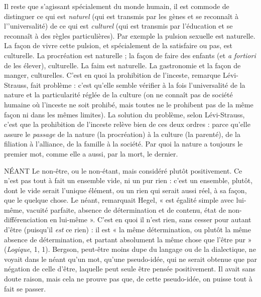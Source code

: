 Il reste que s’agissant spécialement du monde humain, il est commode de
distinguer ce qui est {\it naturel} (qui est transmis par les gènes et se reconnaît à
l’'universalité) de ce qui est {\it culturel} (qui est transmis par l'éducation et se reconnaît
à des règles particulières). Par exemple la pulsion sexuelle est naturelle. La
façon de vivre cette pulsion, et spécialement de la satisfaire ou pas, est culturelle.
La procréation est naturelle ; la façon de faire des enfants (et {\it a fortiori} de
les élever), culturelle. La faim est naturelle. La gastronomie et la façon de
manger, culturelles. C’est en quoi la prohibition de l'inceste, remarque Lévi-Strauss,
fait problème : c’est qu’elle semble vérifier à la fois l’universalité de la
nature et la particularité réglée de la culture (on ne connaît pas de société
humaine où l'inceste ne soit prohibé, mais toutes ne le prohibent pas de la
même façon ni dans les mêmes limites). La solution du problème, selon Lévi-Strauss,
c’est que la prohibition de l'inceste relève bien de ces deux ordres :
parce qu’elle assure le {\it passage} de la nature (la procréation) à la culture (la
parenté), de la filiation à l'alliance, de la famille à la société. Par quoi la nature
a toujours le premier mot, comme elle a aussi, par la mort, le dernier.

NÉANT Le non-être, ou le non-étant, mais considéré plutôt positivement.
Ce n’est pas tout à fait un ensemble vide, ni un pur rien : c’est un
ensemble, plutôt, dont le vide serait l’unique élément, ou un rien qui serait
aussi réel, à sa façon, que le quelque chose. Le néant, remarquait Hegel, « est
égalité simple avec lui-même, vacuité parfaite, absence de détermination et de
contenu, état de non-différenciation en lui-même ». C’est en quoi il n’est rien,
sans cesser pour autant d’être (puisqu'il {\it est} ce rien) : il est « la même détermination,
ou plutôt la même absence de détermination, et partant absolument la
même chose que l'être pur » ({\it Logique}, 1, 1). Bergson, peut-être moins dupe du
langage ou de la dialectique, ne voyait dans le néant qu’un mot, qu’une
pseudo-idée, qui ne serait obtenue que par négation de celle d’être, laquelle
peut seule être pensée positivement. Il avait sans doute raison, mais cela ne
prouve pas que, de cette pseudo-idée, on puisse tout à fait se passer.

